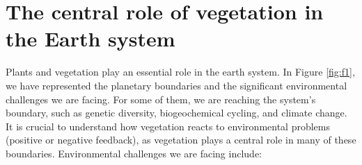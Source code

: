 \documentclass[
  12pt,
  oneside]{book}
\begin{document}
\hypertarget{the-central-role-of-vegetation-in-the-earth-system}{%
\section{The central role of vegetation in the Earth system}\label{the-central-role-of-vegetation-in-the-earth-system}}

Plants and vegetation play an essential role in the earth system. In Figure \ref{fig:f1}, we have represented the planetary boundaries and the significant environmental challenges we are facing. For some of them, we are reaching the system's boundary, such as genetic diversity, biogeochemical cycling, and climate change. It is crucial to understand how vegetation reacts to environmental problems (positive or negative feedback), as vegetation plays a central role in many of these boundaries. Environmental challenges we are facing include:
\end{document}
